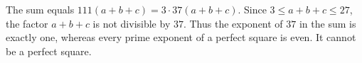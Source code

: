 The sum equals $111(a+b+c)=3\cdot37(a+b+c)$. Since $3\le a+b+c\le27$, the factor $a+b+c$ is not divisible by $37$. Thus the exponent of $37$ in the sum is exactly one, whereas every prime exponent of a perfect square is even. It cannot be a perfect square.
